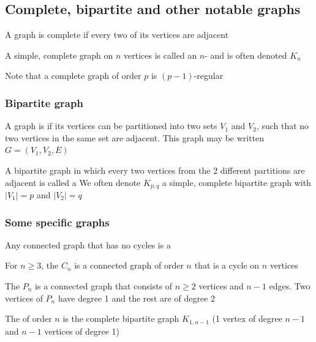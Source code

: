 \documentclass[aspectratio=169]{beamer}\usepackage[]{graphicx}\usepackage[]{xcolor}
\begin{document}
\subsection{Complete, bipartite and other notable graphs}


\begin{frame}
\begin{definition}
A graph is complete if every two of its vertices are adjacent
\end{definition}
\vfill
\begin{definition}[$n$-clique]
	A simple, complete graph on $n$ vertices is called an $n$- and is often denoted $K_n$
\end{definition}
\vfill
Note that a complete graph of order $p$ is $(p-1)$-regular
\end{frame}

\begin{frame}\frametitle{Bipartite graph}
	\begin{definition}
		A graph is  if its vertices can be partitioned into two sets $V_1$ and $V_2$, such that no two vertices in the same set are adjacent.
		This graph may be written $G=(V_1,V_2,E)$
	\end{definition}
	\vfill
	\begin{definition}
		A bipartite graph in which every two vertices from the 2 different partitions are adjacent is called a 
		\vskip0.2cm
		We often denote $K_{p,q}$ a simple, complete bipartite graph with $|V_1|=p$ and $|V_2|=q$
	\end{definition}
\end{frame}

\begin{frame}\frametitle{Some specific graphs}
	\begin{definition}[{Tree}]
		Any connected graph that has no cycles is a 
	\end{definition}
	\begin{definition}[{Cycle $C_n$}]
		For $n\geq 3$, the  $C_n$ is a connected graph of order $n$ that is a cycle on $n$ vertices
	\end{definition}
	\begin{definition}[{Path $P_n$}]
		The  $P_n$ is a connected graph that consists of $n\geq 2$ vertices and $n-1$ edges. Two vertices of $P_n$ have degree 1 and the rest are of degree 2
	\end{definition}
	\begin{definition}[{Star $S_n$}]
		The  of order $n$ is the complete bipartite graph $K_{1,n-1}$ (1 vertex of degree $n-1$ and $n-1$ vertices of degree 1)
	\end{definition}
\end{frame}
\end{document}

